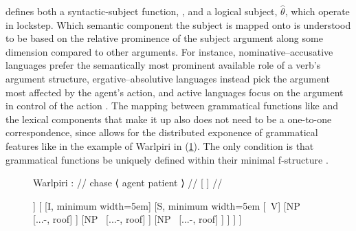 \Lfg{} defines both a syntactic-subject function, \Subj{}, and a logical
subject, $\hat{\theta}$, which operate in lockstep. Which semantic component
the subject is mapped onto is understood to be based on the relative prominence
of the subject argument along some dimension compared to other arguments. For
instance, nominative--accusative languages prefer the semantically most
prominent available role of a verb's argument structure, ergative--absolutive
languages instead pick the argument most affected by the agent's action, and
active languages focus on the argument in control of the action
\citep[95--96]{bresnan2016}. The mapping between grammatical functions like
\Subj{} and the lexical components that make it up also does not need to be a
one-to-one correspondence, since \Lfg{} allows for the distributed exponence of
grammatical features like in the example of Warlpiri in (\ref{ex:warlastruct}).
The only condition is that grammatical functions be uniquely defined within
their minimal f-structure \citep[45]{bresnan2016}.

\begin{figure}[htp]
\ex\label{ex:warlastruct}
\begingl[glwordalign=center]
\glpreamble Warlpiri \citep[325]{bresnan2016}: //
\gla {~\hspace{1.5em}} {} chase {\quad\normalfont ⟨} agent {\quad} patient 
{\normalfont ⟩} {} //
\glb {} {[}
	\Pred{}
	{}
	\Subj{}
	{}
	\Obj{}
	{}
	{]} //
\endgl

\begin{forest}
[IP
	[{NP~\tikzmark{warlastruct_ERGNP1}}
		[{...-\Erg{}}, roof]
	]
	[
		[I, minimum width=5em]
		[S, minimum width=5em
			[{~V}]
			[{NP~}
				[{...-\Abs{}}, roof]
			]
			[{NP~}
				[{...-\Erg{}}, roof]
			]
			[{NP~}
				[{...-\Abs{}}, roof]
			]
		]
	]
]
\end{forest}
\xe
\end{figure}


